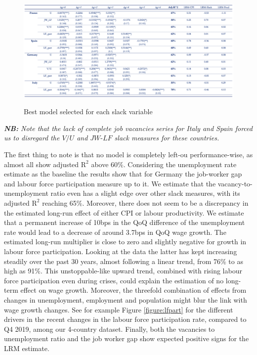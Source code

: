 \begin{figure}[H]
    \centering
    \caption{Best model selected for each slack variable}
    \includegraphics[width=1\textwidth]{Core/2.Labour/img/LRM table.png}
    \label{figure:lrm_table}
\end{figure}
\vspace{-1.5cm}
\noindent \textit{\textbf{NB:} Note that the lack of complete job vacancies series for Italy and Spain forced us to disregard the $V/U$ and $JW\textrm{-}LF$ slack measures for these countries.}

\quad The first thing to note is that no model is completely left-ou performance-wise, as almost all show adjusted $\textrm{R}^{2}$ above 60\%. 
Considering the unemployment rate estimate as the baseline the results show that for Germany the job-worker gap and labour force participation measure up to it. 
We estimate that the vacancy-to-unemployment ratio even has a slight edge over other slack measures, with its adjusted $\textrm{R}^{2}$ reaching 65\%. 
Moreover, there does not seem to be a discrepancy in the estimated long-run effect of either CPI or labour productivity. 
We estimate that a permanent increase of 10bps in the QoQ difference of the unemployment rate would lead to a decrease of around 3.7bps in QoQ wage growth. 
The estimated long-run multiplier is close to zero and slightly negative for growth in labour force participation. 
Looking at the data the latter has kept increasing steadily over the past 30 years, almost following a linear trend, from 76\% to as high as 91\%. 
This unstoppable-like upward trend, combined with rising labour force participation even during crises, could explain the estimation of no long-term effect on wage growth. 
Moreover, the threefold combination of effects from changes in unemployment, employment and population might blur the link with wage growth changes. 
See for example Figure \ref{figure:lfpart} for the different drivers in the recent changes in the labour force participation rate, compared to Q4 2019, among our 4-country dataset. 
Finally, both the vacancies to unemployment ratio and the job worker gap show expected positive signs for the LRM estimate. 

